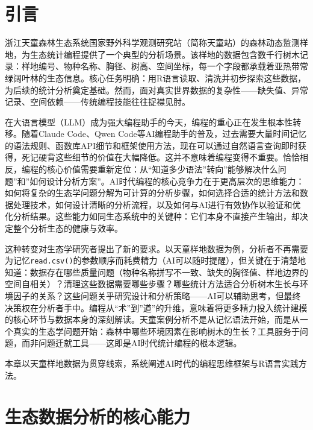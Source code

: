 \documentclass[
  twoside,12pt,fontset=none]{ctexbook}
\begin{document}
\hypertarget{ux5f15ux8a00}{%
\section{引言}\label{ux5f15ux8a00}}

浙江天童森林生态系统国家野外科学观测研究站（简称天童站）的森林动态监测样地，为生态统计编程提供了一个典型的分析场景。该样地的数据包含数千行树木记录：样地编号、物种名称、胸径、树高、空间坐标，每一个字段都承载着亚热带常绿阔叶林的生态信息。核心任务明确：用R语言读取、清洗并初步探索这些数据，为后续的统计分析奠定基础。然而，面对真实世界数据的复杂性------缺失值、异常记录、空间依赖------传统编程技能往往捉襟见肘。

在大语言模型（LLM）成为强大编程助手的今天，编程的重心正在发生根本性转移。随着Claude Code、Qwen Code等AI编程助手的普及，过去需要大量时间记忆的语法规则、函数库API细节和框架使用方法，现在可以通过自然语言查询即时获得，死记硬背这些细节的价值在大幅降低。这并不意味着编程变得不重要。恰恰相反，编程的核心价值需要重新定位：从``知道多少语法''转向''能够解决什么问题''和''如何设计分析方案''。AI时代编程的核心竞争力在于更高层次的思维能力：如何将复杂的生态学问题分解为可计算的分析步骤，如何选择合适的统计方法和数据处理技术，如何设计清晰的分析流程，以及如何与AI进行有效协作以验证和优化分析结果。这些能力如同生态系统中的关键种：它们本身不直接产生输出，却决定整个分析生态的健康与效率。

这种转变对生态学研究者提出了新的要求。以天童样地数据为例，分析者不再需要为记忆\texttt{read.csv()}的参数顺序而耗费精力（AI可以随时提醒），但关键在于清楚地知道：数据存在哪些质量问题（物种名称拼写不一致、缺失的胸径值、样地边界的空间自相关）？清理这些数据需要哪些步骤？哪些统计方法适合分析树木生长与环境因子的关系？这些问题关乎研究设计和分析策略------AI可以辅助思考，但最终决策权在分析者手中。编程从``术''到''道''的升维，意味着将更多精力投入统计建模的核心环节与数据本身的深刻解读。天童案例分析不是从记忆语法开始，而是从一个真实的生态学问题开始：森林中哪些环境因素在影响树木的生长？工具服务于问题，而非问题迁就工具------这即是AI时代统计编程的根本逻辑。

本章以天童样地数据为贯穿线索，系统阐述AI时代的编程思维框架与R语言实践方法。

\hypertarget{ux751fux6001ux6570ux636eux5206ux6790ux7684ux6838ux5fc3ux80fdux529b}{%
\section{生态数据分析的核心能力}\label{ux751fux6001ux6570ux636eux5206ux6790ux7684ux6838ux5fc3ux80fdux529b}}
\end{document}
